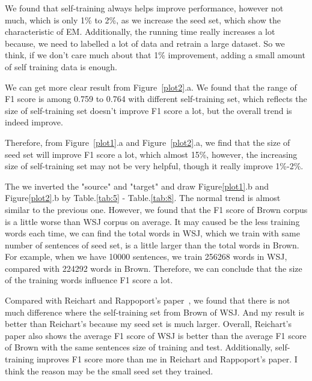 \documentclass[journal, a4paper]{IEEEtran}
\begin{document}
We found that self-training always helps improve performance, however not much, which is only 1\% to 2\%, as we increase the seed set, which show the characteristic of EM. Additionally, the running time really increases a lot because, we need to labelled a lot of data and retrain a large dataset. So we think, if we don't care much about that 1\% improvement, adding a small amount of self training data is enough.

We can get more clear result from Figure~\ref{plot2}.a. We found that the range of F1 score is among 0.759 to 0.764 with different self-training set, which reflects the size of self-training set doesn't improve F1 score a lot, but the overall trend is indeed improve.

Therefore, from Figure~\ref{plot1}.a and Figure~\ref{plot2}.a, we find that the size of seed set will improve F1 score a lot, which almost 15\%, however, the increasing size of self-training set may not be very helpful, though it really improve 1\%-2\%.

The we inverted the "source" and "target" and draw Figure\ref{plot1}.b and Figure\ref{plot2}.b by Table.\ref{tab:5} - Table.\ref{tab:8}. The normal trend is almost similar to the previous one. However, we found that the F1 score of  Brown corpus is a little worse than WSJ corpus on average. It may caused be the less training words each time, we can find the total words in WSJ, which we train with same number of sentences of seed set, is a little larger than the total words in Brown. For example, when we have 10000 sentences, we train 256268 words in WSJ, compared with 224292 words in Brown. Therefore, we can conclude that the size of the training words influence F1 score a lot.

Compared with Reichart and Rappoport's paper~\cite{EXPERT}, we found that there is not much difference where the self-training set from Brown of WSJ. And my result is better than Reichart's because my seed set is much larger. Overall, Reichart's paper also shows the average F1 score of WSJ is better than the average F1 score of Brown with the same sentences size of training and test.
Additionally, self-training improves F1 score more than me in Reichart and Rappoport's paper. I think the reason may be the small seed set they trained.
\end{document}
